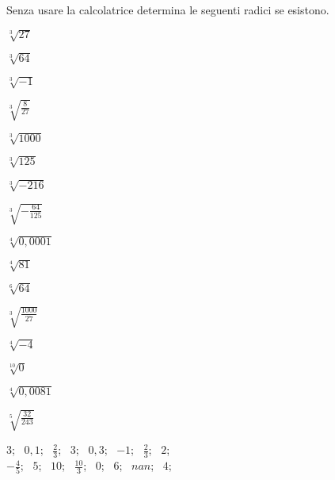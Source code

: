 \begin{esercizio}
\label{ese:2.06}
Senza usare la calcolatrice determina le seguenti radici se esistono.
\begin{htmulticols}{4}
\begin{enumeratea}
\item \(\sqrt[3]{27}\)
\item \(\sqrt[3]{64}\)
\item \(\sqrt[3]{-1}\)
\item \(\sqrt[3]{\frac 8{27}}\)
\item \(\sqrt[3]{1000}\)
\item \(\sqrt[3]{125}\)
\item \(\sqrt[3]{-216}\)
\item \(\sqrt[3]{-\frac{64}{125}}\)
\item \(\sqrt[4]{0,0001}\)
\item \(\sqrt[4]{81}\)
\item \(\sqrt[6]{64}\)
\item \(\sqrt[3]{\frac{1000}{27}}\)
\item \(\sqrt[4]{-4}\)
\item \(\sqrt[10]0\)
\item \(\sqrt[4]{0,0081}\)
\item \(\sqrt[5]{\frac{32}{243}}\)
\end{enumeratea}
\end{htmulticols}
\noindent\! \(3\);~
 \(0,1\);~ 
 \(\frac{2}{3}\);~ 
 \(3\);~  
 \(0,3\);~ 
 \(-1\);~ 
 \(\frac{2}{3}\);~
 \(2\);~ \\
 \(-\frac{4}{5}\);~ 
 \(5\);~ 
 \(10\);~ 
 \(\frac{10}{3}\);~ 
 \(0\);~ 
 \(6\);~  
 \(nan\);~ 
 \(4\);~ 
\end{esercizio}

